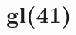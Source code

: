 \documentclass[12pt,a4paper]{article}
\begin{document}
\maketitle


%
%
%
%
%
%
%
%
\section{gl(41)}







\end{document}
